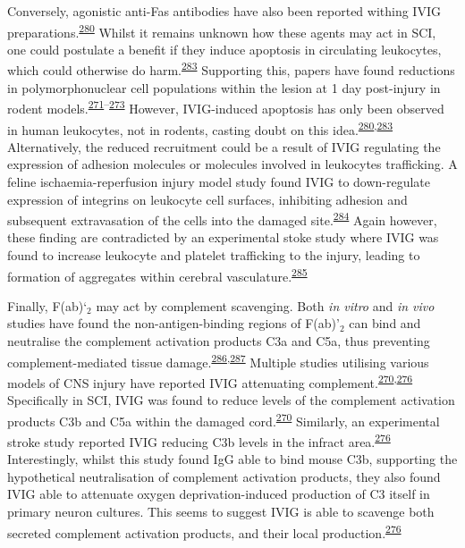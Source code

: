 \documentclass[
]{article}
\begin{document}
Conversely, agonistic anti-Fas antibodies have also been reported withing IVIG preparations.\textsuperscript{\protect\hyperlink{ref-altznauer_concurrent_2003}{280}}
Whilst it remains unknown how these agents may act in SCI, one could postulate a benefit if they induce apoptosis in circulating leukocytes, which could otherwise do harm.\textsuperscript{\protect\hyperlink{ref-schneider_ivig_2017}{283}}
Supporting this, papers have found reductions in polymorphonuclear cell populations within the lesion at 1 day post-injury in rodent models.\textsuperscript{\protect\hyperlink{ref-nguyen_immunoglobulin_2012}{271}--\protect\hyperlink{ref-gok_immunomodulation_2009}{273}}
However, IVIG-induced apoptosis has only been observed in human leukocytes, not in rodents, casting doubt on this idea.\textsuperscript{\protect\hyperlink{ref-altznauer_concurrent_2003}{280},\protect\hyperlink{ref-schneider_ivig_2017}{283}}
Alternatively, the reduced recruitment could be a result of IVIG regulating the expression of adhesion molecules or molecules involved in leukocytes trafficking.
A feline ischaemia-reperfusion injury model study found IVIG to down-regulate expression of integrins on leukocyte cell surfaces, inhibiting adhesion and subsequent extravasation of the cells into the damaged site.\textsuperscript{\protect\hyperlink{ref-gill_targeting_2005}{284}}
Again however, these finding are contradicted by an experimental stoke study where IVIG was found to increase leukocyte and platelet trafficking to the injury, leading to formation of aggregates within cerebral vasculature.\textsuperscript{\protect\hyperlink{ref-lapointe_ivig_2004}{285}}

Finally, F(ab)`\(_2\) may act by complement scavenging.
Both \emph{in vitro} and \emph{in vivo} studies have found the non-antigen-binding regions of F(ab)'\(_2\) can bind and neutralise the complement activation products C3a and C5a, thus preventing complement-mediated tissue damage.\textsuperscript{\protect\hyperlink{ref-basta_fab2-mediated_2003}{286},\protect\hyperlink{ref-basta_mechanism_1989}{287}}
Multiple studies utilising various models of CNS injury have reported IVIG attenuating complement.\textsuperscript{\protect\hyperlink{ref-brennan_ivig_2016}{270},\protect\hyperlink{ref-arumugam_intravenous_2007}{276}}
Specifically in SCI, IVIG was found to reduce levels of the complement activation products C3b and C5a within the damaged cord.\textsuperscript{\protect\hyperlink{ref-brennan_ivig_2016}{270}}
Similarly, an experimental stroke study reported IVIG reducing C3b levels in the infract area.\textsuperscript{\protect\hyperlink{ref-arumugam_intravenous_2007}{276}}
Interestingly, whilst this study found IgG able to bind mouse C3b, supporting the hypothetical neutralisation of complement activation products, they also found IVIG able to attenuate oxygen deprivation-induced production of C3 itself in primary neuron cultures.
This seems to suggest IVIG is able to scavenge both secreted complement activation products, and their local production.\textsuperscript{\protect\hyperlink{ref-arumugam_intravenous_2007}{276}}
\end{document}
